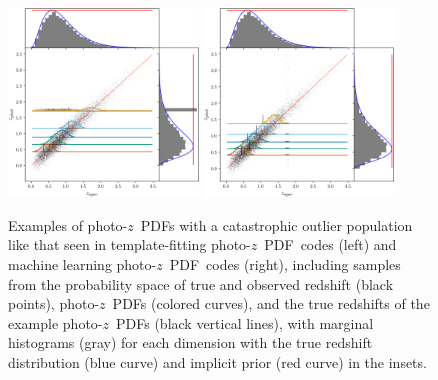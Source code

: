 \documentclass[iop]{emulateapj}
\newcommand{\pz}{photo-$z$~}
\newcommand{\pzpdf}{\pz PDF}
\begin{document}
\begin{figure}
	\begin{center}
	\includegraphics[width=0.45\textwidth]{figures/chippr/thesis_eout_mega_scatter.png}
	\includegraphics[width=0.45\textwidth]{figures/chippr/thesis_rout_mega_scatter.png}
	\caption{
		Examples of \pzpdf s with a catastrophic outlier population like that seen in template-fitting \pzpdf\ codes (left) and machine learning \pzpdf\ codes (right), including samples from the probability space of true and observed redshift (black points), \pzpdf s (colored curves), and the true redshifts of the example \pzpdf s (black vertical lines), with marginal histograms (gray) for each dimension with the true redshift distribution (blue curve) and implicit prior (red curve) in the insets.
	}
	\label{fig:nonuniform-outliers-data}
	\end{center}
\end{figure}
\end{document}
